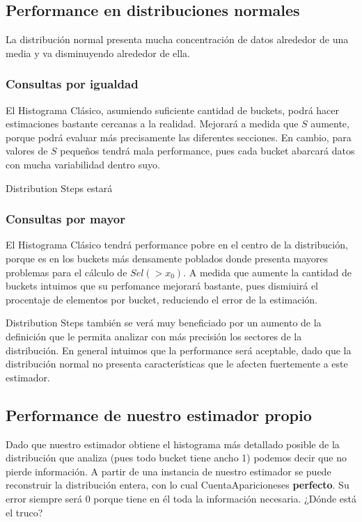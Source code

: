 \subsection{Performance en distribuciones normales}
La distribución normal presenta mucha concentración de datos alrededor de una media y va disminuyendo alrededor de ella.

\subsubsection{Consultas por igualdad}
El Histograma Clásico, asumiendo suficiente cantidad de buckets, podrá hacer estimaciones bastante cercanas a la realidad. Mejorará a medida que $S$ aumente, porque podrá evaluar más precisamente las diferentes secciones. En cambio, para valores de $S$ pequeños tendrá mala performance, pues cada bucket abarcará datos con mucha variabilidad dentro suyo.

Distribution Steps estará 

\subsubsection{Consultas por mayor}
El Histograma Clásico tendrá performance pobre en el centro de la distribución, porque es en los buckets más densamente poblados donde presenta mayores problemas para el cálculo de $Sel(>x_0)$. A medida que aumente la cantidad de buckets intuimos que su perfomance mejorará bastante, pues dismiuirá el procentaje de elementos por bucket, reduciendo el error de la estimación.

Distribution Steps también se verá muy beneficiado por un aumento de la definición que le permita analizar con más precisión los sectores de la distribución. En general intuimos que la performance será aceptable, dado que la distribución normal no presenta características que le afecten fuertemente a este estimador.



\subsection{Performance de nuestro estimador propio}
Dado que nuestro estimador obtiene el histograma más detallado posible de la distribución que analiza (pues todo bucket tiene ancho 1) podemos decir que no pierde información. A partir de una instancia de nuestro estimador se puede reconstruir la distribución entera, con lo cual CuentaApariciones\texttrademark es \textbf{perfecto}. Su error siempre será 0 porque tiene en él toda la información necesaria. ¿Dónde está el truco?


